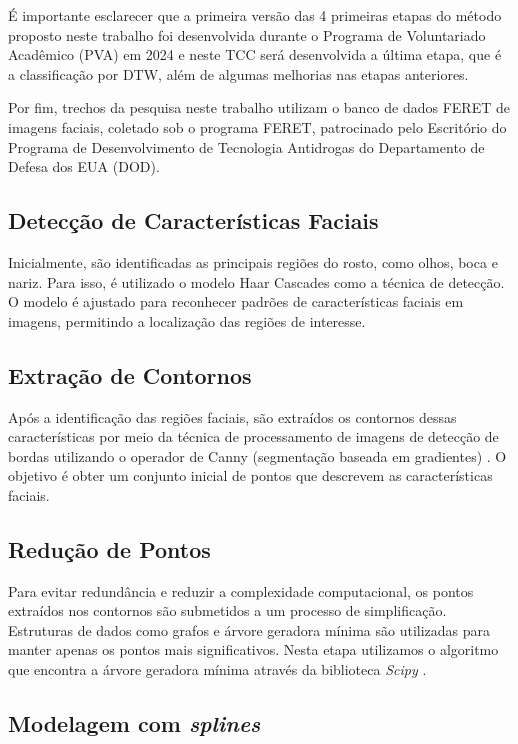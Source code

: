 É importante esclarecer que a primeira versão das 4 primeiras etapas do método proposto neste trabalho foi desenvolvida durante o Programa de Voluntariado Acadêmico (PVA) em 2024 e neste TCC será desenvolvida a última etapa, que é a classificação por DTW, além de algumas melhorias nas etapas anteriores.

Por fim, trechos da pesquisa neste trabalho utilizam o banco de dados FERET \cite{FERET1,FERET2} de imagens faciais, coletado sob o programa FERET, patrocinado pelo Escritório do Programa de Desenvolvimento de Tecnologia Antidrogas do Departamento de Defesa dos EUA (DOD).

\subsection{Detecção de Características Faciais}

Inicialmente, são identificadas as principais regiões do rosto, como olhos, boca e nariz. Para isso, é utilizado o modelo Haar Cascades \cite{BoostedCascade, HaarAplicacao} como a técnica de detecção. O modelo é ajustado para reconhecer padrões de características faciais em imagens, permitindo a localização das regiões de interesse.

\subsection{Extração de Contornos} 

Após a identificação das regiões faciais, são extraídos os contornos dessas características por meio da técnica de processamento de imagens de detecção de bordas utilizando o operador de Canny (segmentação baseada em gradientes) \cite{Canny,CannyAplicacao}. O objetivo é obter um conjunto inicial de pontos que descrevem as características faciais.

\subsection{Redução de Pontos}

Para evitar redundância e reduzir a complexidade computacional, os pontos extraídos nos contornos são submetidos a um processo de simplificação. Estruturas de dados como grafos e árvore geradora mínima são utilizadas para manter apenas os pontos mais significativos. Nesta etapa utilizamos o algoritmo que encontra a árvore geradora mínima através da biblioteca \textit{Scipy} \cite{Scipy}.

\subsection{Modelagem com \textit{splines}}

